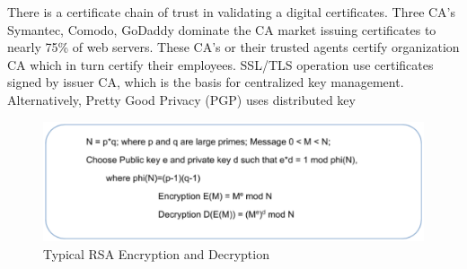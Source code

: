 \begin{multicols}{2}
{\parfillskip=0pt
There is a certificate chain of trust in validating a digital certificates. Three CA's Symantec, Comodo, GoDaddy dominate the CA market issuing certificates to nearly 75\% of web servers. These CA's or their trusted agents certify organization CA which in turn certify their employees. SSL/TLS operation use certificates signed by issuer CA, which is the basis for centralized key management. Alternatively, Pretty Good Privacy (PGP) uses distributed key\par}
\end{multicols}


\begin{figure}[!ht]
\centering
\includegraphics[scale=.9]{src/Figures/chap2/4.eps}
\caption{Typical RSA Encryption and Decryption}\label{chap2-fig4}
\end{figure}

